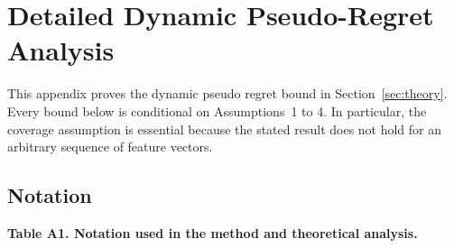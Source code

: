 \appendix
\section{Detailed Dynamic Pseudo-Regret Analysis}
\label{app:proof}

This appendix proves the dynamic pseudo regret bound in Section~\ref{sec:theory}. Every bound below is conditional on Assumptions~1 to 4. In particular, the coverage assumption is essential because the stated result does not hold for an arbitrary sequence of feature vectors.

\subsection{Notation}

\begin{center}
\textbf{Table A1. Notation used in the method and theoretical analysis.}


\end{center}

